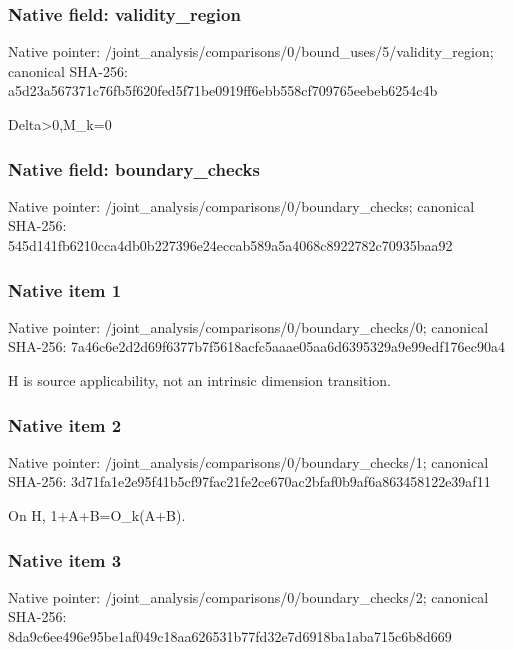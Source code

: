 \documentclass[10pt,a4paper]{article}
\begin{document}
\subsubsection{Native field: validity\_\allowbreak{}region}
Native pointer: /joint\_\allowbreak{}analysis/comparisons/0/bound\_\allowbreak{}uses/5/validity\_\allowbreak{}region; canonical SHA-256: a5d23a567371c76fb5f620fed5f71be0919ff6ebb558cf709765eebeb6254c4b

\begingroup\raggedright\sloppy Delta>0,\allowbreak{}M\_\allowbreak{}k=\allowbreak{}0\par\endgroup

\subsubsection{Native field: boundary\_\allowbreak{}checks}
Native pointer: /joint\_\allowbreak{}analysis/comparisons/0/boundary\_\allowbreak{}checks; canonical SHA-256: 545d141fb6210cca4db0b227396e24eccab589a5a4068c8922782c70935baa92

\subsubsection{Native item 1}
Native pointer: /joint\_\allowbreak{}analysis/comparisons/0/boundary\_\allowbreak{}checks/0; canonical SHA-256: 7a46c6e2d2d69f6377b7f5618acfc5aaae05aa6d6395329a9e99edf176ec90a4

\begingroup\raggedright\sloppy H is source applicability,\allowbreak{} not an intrinsic dimension transition.\par\endgroup

\subsubsection{Native item 2}
Native pointer: /joint\_\allowbreak{}analysis/comparisons/0/boundary\_\allowbreak{}checks/1; canonical SHA-256: 3d71fa1e2e95f41b5cf97fac21fe2ce670ac2bfaf0b9af6a863458122e39af11

\begingroup\raggedright\sloppy On H,\allowbreak{} 1+A+B=\allowbreak{}O\_\allowbreak{}k(A+B).\par\endgroup

\subsubsection{Native item 3}
Native pointer: /joint\_\allowbreak{}analysis/comparisons/0/boundary\_\allowbreak{}checks/2; canonical SHA-256: 8da9c6ee496e95be1af049c18aa626531b77fd32e7d6918ba1aba715c6b8d669
\end{document}
